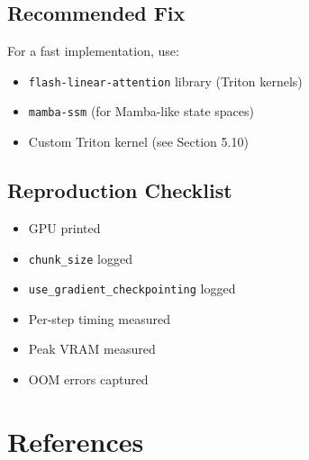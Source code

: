\subsection{Recommended Fix}

For a fast implementation, use:

\begin{itemize}
\item \texttt{flash-linear-attention} library (Triton kernels)
\item \texttt{mamba-ssm} (for Mamba-like state spaces)
\item Custom Triton kernel (see Section 5.10)

\end{itemize}
\subsection{Reproduction Checklist}

\begin{itemize}
\item [ ] GPU printed
\item [ ] \texttt{chunk\_size} logged
\item [ ] \texttt{use\_gradient\_checkpointing} logged
\item [ ] Per-step timing measured
\item [ ] Peak VRAM measured
\item [ ] OOM errors captured

\end{itemize}



\section{References}

